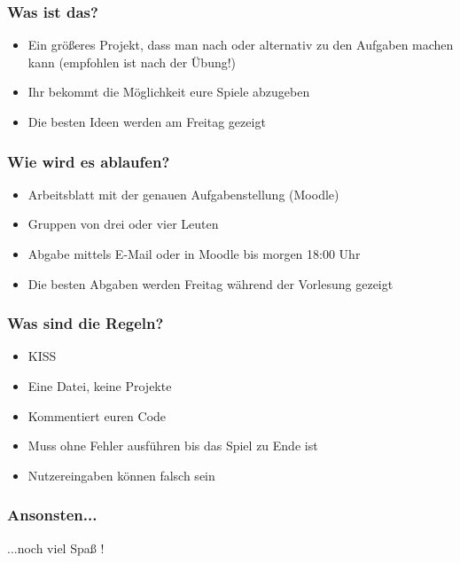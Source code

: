 \begin{frame}
    \frametitle{Was ist das?}
    \begin{itemize}
        \item Ein größeres Projekt, dass man nach oder alternativ zu den Aufgaben machen kann (empfohlen ist nach der Übung!)
        \item Ihr bekommt die Möglichkeit eure Spiele abzugeben
        \item Die besten Ideen werden am Freitag gezeigt
    \end{itemize}
\end{frame}

\begin{frame}
    \frametitle{Wie wird es ablaufen?}
    \begin{itemize}
        \item Arbeitsblatt mit der genauen Aufgabenstellung (Moodle)
        \item Gruppen von drei oder vier Leuten
        \item Abgabe mittels E-Mail oder in Moodle bis morgen 18:00 Uhr
        \item Die besten Abgaben werden Freitag während der Vorlesung gezeigt
    \end{itemize}
\end{frame}

\begin{frame}
    \frametitle{Was sind die Regeln?}
    \begin{itemize}
        \item KISS
        \item Eine Datei, keine Projekte
        \item Kommentiert euren Code
        \item Muss ohne Fehler ausführen bis das Spiel zu Ende ist
        \item Nutzereingaben können falsch sein
    \end{itemize}
\end{frame}

\begin{frame}
    \frametitle{Ansonsten...}
    \vspace{15mm}
    \begin{center}
        \huge ...noch viel Spaß !
    \end{center}
\end{frame}

